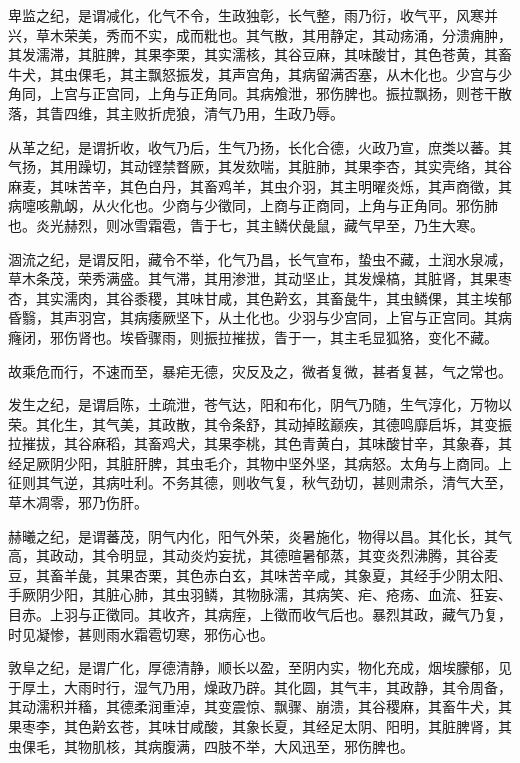 \documentclass{article}%
\begin{document}
卑监之纪，是谓减化，化气不令，生政独彰，长气整，雨乃衍，收气平，风寒并兴，草木荣美，秀而不实，成而粃也。其气散，其用静定，其动疡涌，分溃痈肿，其发濡滞，其脏脾，其果李栗，其实濡核，其谷豆麻，其味酸甘，其色苍黄，其畜牛犬，其虫倮毛，其主飘怒振发，其声宫角，其病留满否塞，从木化也。少宫与少角同，上宫与正宫同，上角与正角同。其病飧泄，邪伤脾也。振拉飘扬，则苍干散落，其眚四维，其主败折虎狼，清气乃用，生政乃辱。

从革之纪，是谓折收，收气乃后，生气乃扬，长化合德，火政乃宣，庶类以蕃。其气扬，其用躁切，其动铿禁瞀厥，其发欬喘，其脏肺，其果李杏，其实壳络，其谷麻麦，其味苦辛，其色白丹，其畜鸡羊，其虫介羽，其主明曜炎烁，其声商徵，其病嚏咳鼽衂，从火化也。少商与少徵同，上商与正商同，上角与正角同。邪伤肺也。炎光赫烈，则冰雪霜雹，眚于七，其主鳞伏彘鼠，藏气早至，乃生大寒。

涸流之纪，是谓反阳，藏令不举，化气乃昌，长气宣布，蛰虫不藏，土润水泉减，草木条茂，荣秀满盛。其气滞，其用渗泄，其动坚止，其发燥槁，其脏肾，其果枣杏，其实濡肉，其谷黍稷，其味甘咸，其色黅玄，其畜彘牛，其虫鳞倮，其主埃郁昏翳，其声羽宫，其病痿厥坚下，从土化也。少羽与少宫同，上官与正宫同。其病癃闭，邪伤肾也。埃昏骤雨，则振拉摧拔，眚于一，其主毛显狐狢，变化不藏。

故乘危而行，不速而至，暴疟无德，灾反及之，微者复微，甚者复甚，气之常也。

发生之纪，是谓启陈，土疏泄，苍气达，阳和布化，阴气乃随，生气淳化，万物以荣。其化生，其气美，其政散，其令条舒，其动掉眩巅疾，其德鸣靡启坼，其变振拉摧拔，其谷麻稻，其畜鸡犬，其果李桃，其色青黄白，其味酸甘辛，其象春，其经足厥阴少阳，其脏肝脾，其虫毛介，其物中坚外坚，其病怒。太角与上商同。上征则其气逆，其病吐利。不务其德，则收气复，秋气劲切，甚则肃杀，清气大至，草木凋零，邪乃伤肝。

赫曦之纪，是谓蕃茂，阴气内化，阳气外荣，炎暑施化，物得以昌。其化长，其气高，其政动，其令明显，其动炎灼妄扰，其德暄暑郁蒸，其变炎烈沸腾，其谷麦豆，其畜羊彘，其果杏栗，其色赤白玄，其味苦辛咸，其象夏，其经手少阴太阳、手厥阴少阳，其脏心肺，其虫羽鳞，其物脉濡，其病笑、疟、疮疡、血流、狂妄、目赤。上羽与正徵同。其收齐，其病痓，上徵而收气后也。暴烈其政，藏气乃复，时见凝惨，甚则雨水霜雹切寒，邪伤心也。

敦阜之纪，是谓广化，厚德清静，顺长以盈，至阴内实，物化充成，烟埃朦郁，见于厚土，大雨时行，湿气乃用，燥政乃辟。其化圆，其气丰，其政静，其令周备，其动濡积并稸，其德柔润重淖，其变震惊、飘骤、崩溃，其谷稷麻，其畜牛犬，其果枣李，其色黅玄苍，其味甘咸酸，其象长夏，其经足太阴、阳明，其脏脾肾，其虫倮毛，其物肌核，其病腹满，四肢不举，大风迅至，邪伤脾也。
\end{document}
